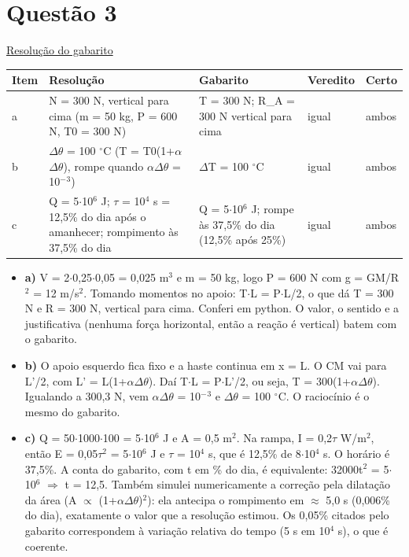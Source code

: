 \documentclass{article}%
\begin{document}
\section*{Questão 3}%
\href{https://poliedroresolve.sistemapoliedro.com.br/vestibulares/ime/2027/ime-2-fase-dia-2-27-10-2026-2-fase-dia-2/dissertativa-3-fisica-2-fase-dia-2-ime-2027}{Resolução do gabarito}\par\smallskip%
\begin{longtable}{@{}p{} p{} p{} p{} p{}@{}}\toprule Item & Resolução & Gabarito & Veredito & Certo \\ \midrule
a & N = 300 N, vertical para cima (m = 50 kg, P = 600 N, T0 = 300 N) & T = 300 N; R\_A = 300 N vertical para cima & igual & ambos \\
b & $\Delta$$\theta$ = 100 $^\circ$C (T = T0(1+$\alpha$$\Delta$$\theta$), rompe quando $\alpha$$\Delta$$\theta$ = 10$^{-}$$^3$) & $\Delta$T = 100 $^\circ$C & igual & ambos \\
c & Q = 5$\cdot$10$^{6}$ J; $\tau$ = 10$^{4}$ s = 12,5\% do dia após o amanhecer; rompimento às 37,5\% do dia & Q = 5$\cdot$10$^{6}$ J; rompe às 37,5\% do dia (12,5\% após 25\%) & igual & ambos \\
\bottomrule\end{longtable}%
\begin{itemize}%
\item%
\textbf{a)} V = 2$\cdot$0,25$\cdot$0,05 = 0,025 m$^3$ e m = 50 kg, logo P = 600 N com g = GM/R$^2$ = 12 m/s$^2$. Tomando momentos no apoio: T$\cdot$L = P$\cdot$L/2, o que dá T = 300 N e R = 300 N, vertical para cima. Conferi em python. O valor, o sentido e a justificativa (nenhuma força horizontal, então a reação é vertical) batem com o gabarito.%
\item%
\textbf{b)} O apoio esquerdo fica fixo e a haste continua em x = L. O CM vai para L'/2, com L' = L(1+$\alpha$$\Delta$$\theta$). Daí T$\cdot$L = P$\cdot$L'/2, ou seja, T = 300(1+$\alpha$$\Delta$$\theta$). Igualando a 300,3 N, vem $\alpha$$\Delta$$\theta$ = 10$^{-}$$^3$ e $\Delta$$\theta$ = 100 $^\circ$C. O raciocínio é o mesmo do gabarito.%
\item%
\textbf{c)} Q = 50$\cdot$1000$\cdot$100 = 5$\cdot$10$^{6}$ J e A = 0,5 m$^2$. Na rampa, I = 0,2$\tau$ W/m$^2$, então E = 0,05$\tau$$^2$ = 5$\cdot$10$^{6}$ J e $\tau$ = 10$^{4}$ s, que é 12,5\% de 8$\cdot$10$^{4}$ s. O horário é 37,5\%. A conta do gabarito, com t em \% do dia, é equivalente: 32000t$^2$ = 5$\cdot$10$^{6}$ $\Rightarrow$ t = 12,5. Também simulei numericamente a correção pela dilatação da área (A $\propto$ (1+$\alpha$$\Delta$$\theta$)$^2$): ela antecipa o rompimento em $\approx$ 5,0 s (0,006\% do dia), exatamente o valor que a resolução estimou. Os 0,05\% citados pelo gabarito correspondem à variação relativa do tempo (5 s em 10$^{4}$ s), o que é coerente.%
\end{itemize}%
\end{document}
